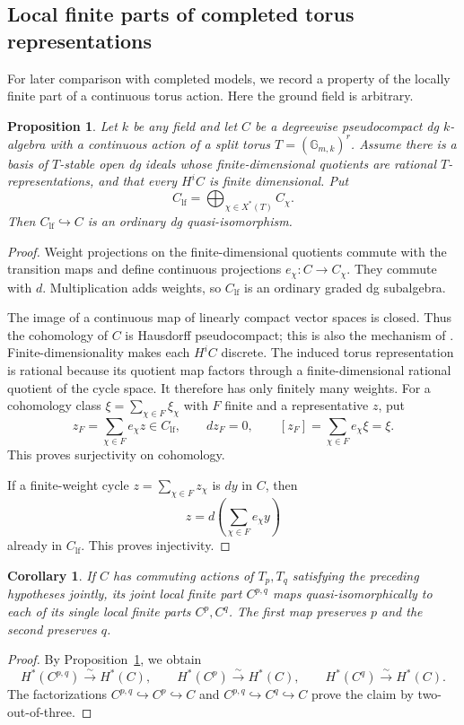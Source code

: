 \documentclass[12pt,a4paper,english,reqno]{amsart}
\theoremstyle{plain}
\newtheorem{prp}[thm]{Proposition}
\newtheorem{cor}[thm]{Corollary}
\theoremstyle{definition}
\numberwithin{equation}{section}
\newcommand{\prpref}[1]{Proposition~\ref{#1}}
\def\incl{\hookrightarrow}
\def\Ds{\bigoplus}
\def\ya#1{\xrightarrow{#1}}
\begin{document}
\subsection{Local finite parts of completed torus representations}\label{subsec:localfinite}
For later comparison with completed models, we record a property of the locally finite part of a continuous torus action. Here the ground field is arbitrary.

\begin{prp}\label{prop:localfinite}
Let $k$ be any field and let $C$ be a degreewise pseudocompact dg $k$-algebra with a continuous action of a split torus $T=(\mathbb G_{m,k})^r$. Assume there is a basis of $T$-stable open dg ideals whose finite-dimensional quotients are rational $T$-representations, and that every $H^iC$ is finite dimensional. Put
\[
 C_{\mathrm{lf}}=\Ds_{\chi\in X^*(T)}C_\chi.
\]
Then $C_{\mathrm{lf}}\incl C$ is an ordinary dg quasi-isomorphism.
\end{prp}
\begin{proof}
Weight projections on the finite-dimensional quotients commute with the transition maps and define continuous projections $e_\chi:C\to C_\chi$. They commute with $d$. Multiplication adds weights, so $C_{\mathrm{lf}}$ is an ordinary graded dg subalgebra.

The image of a continuous map of linearly compact vector spaces is closed. Thus the cohomology of $C$ is Hausdorff pseudocompact; this is also the mechanism of \cite[Lemma 7.12]{KY}. Finite-dimensionality makes each $H^iC$ discrete. The induced torus representation is rational because its quotient map factors through a finite-dimensional rational quotient of the cycle space. It therefore has only finitely many weights. For a cohomology class $\xi=\sum_{\chi\in F}\xi_\chi$ with $F$ finite and a representative $z$, put
\[
 z_F=\sum_{\chi\in F}e_\chi z\in C_{\mathrm{lf}},\qquad
 dz_F=0,\qquad[z_F]=\sum_{\chi\in F}e_\chi\xi=\xi.
\]
This proves surjectivity on cohomology.

If a finite-weight cycle $z=\sum_{\chi\in F}z_\chi$ is $dy$ in $C$, then
\[
 z=d\left(\sum_{\chi\in F}e_\chi y\right)
\]
already in $C_{\mathrm{lf}}$. This proves injectivity.
\end{proof}

\begin{cor}\label{cor:localfinite}
If $C$ has commuting actions of $T_p,T_q$ satisfying the preceding hypotheses jointly, its joint local finite part $C^{p,q}$ maps quasi-isomorphically to each of its single local finite parts $C^p,C^q$. The first map preserves $p$ and the second preserves $q$.
\end{cor}
\begin{proof}
By \prpref{prop:localfinite}, we obtain
\[
 H^*(C^{p,q})\ya{\sim}H^*(C),\qquad
 H^*(C^p)\ya{\sim}H^*(C),\qquad
 H^*(C^q)\ya{\sim}H^*(C).
\]
The factorizations $C^{p,q}\incl C^p\incl C$ and $C^{p,q}\incl C^q\incl C$ prove the claim by two-out-of-three.
\end{proof}
\end{document}
